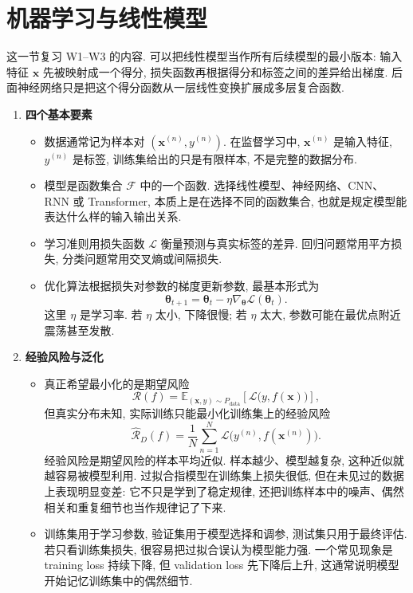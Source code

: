 \documentclass{../nndlcourse}
\begin{document}
\section{机器学习与线性模型}

这一节复习 W1--W3 的内容. 可以把线性模型当作所有后续模型的最小版本: 输入特征 $\boldsymbol{x}$ 先被映射成一个得分, 损失函数再根据得分和标签之间的差异给出梯度. 后面神经网络只是把这个得分函数从一层线性变换扩展成多层复合函数.

\begin{enumerate}
    \item \textbf{四个基本要素}
    \begin{itemize}
        \item 数据通常记为样本对 $(\boldsymbol{x}^{(n)}, y^{(n)})$. 在监督学习中, $\boldsymbol{x}^{(n)}$ 是输入特征, $y^{(n)}$ 是标签, 训练集给出的只是有限样本, 不是完整的数据分布.
        \item 模型是函数集合 $\mathcal{F}$ 中的一个函数. 选择线性模型、神经网络、CNN、RNN 或 Transformer, 本质上是在选择不同的函数集合, 也就是规定模型能表达什么样的输入输出关系.
        \item 学习准则用损失函数 $\mathcal{L}$ 衡量预测与真实标签的差异. 回归问题常用平方损失, 分类问题常用交叉熵或间隔损失.
        \item 优化算法根据损失对参数的梯度更新参数, 最基本形式为
        \[
            \boldsymbol{\theta}_{t+1}
            =
            \boldsymbol{\theta}_{t}
            -
            \eta \nabla_{\boldsymbol{\theta}}\mathcal{L}(\boldsymbol{\theta}_{t}).
        \]
        这里 $\eta$ 是学习率. 若 $\eta$ 太小, 下降很慢; 若 $\eta$ 太大, 参数可能在最优点附近震荡甚至发散.
    \end{itemize}

    \item \textbf{经验风险与泛化}
    \begin{itemize}
        \item 真正希望最小化的是期望风险
        \[
            \mathcal{R}(f)
            =
            \mathbb{E}_{(\boldsymbol{x},y)\sim P_{\mathrm{data}}}
            \left[
                \mathcal{L}\bigl(y,f(\boldsymbol{x})\bigr)
            \right],
        \]
        但真实分布未知, 实际训练只能最小化训练集上的经验风险
        \[
            \hat{\mathcal{R}}_D(f)
            =
            \frac{1}{N}\sum_{n=1}^{N}
            \mathcal{L}\bigl(y^{(n)},f(\boldsymbol{x}^{(n)})\bigr).
        \]
        经验风险是期望风险的样本平均近似. 样本越少、模型越复杂, 这种近似就越容易被模型利用. 过拟合指模型在训练集上损失很低, 但在未见过的数据上表现明显变差: 它不只是学到了稳定规律, 还把训练样本中的噪声、偶然相关和重复细节也当作规律记了下来.
        \item 训练集用于学习参数, 验证集用于模型选择和调参, 测试集只用于最终评估. 若只看训练集损失, 很容易把过拟合误认为模型能力强. 一个常见现象是 training loss 持续下降, 但 validation loss 先下降后上升, 这通常说明模型开始记忆训练集中的偶然细节.
    \end{itemize}


\end{enumerate}
\end{document}
